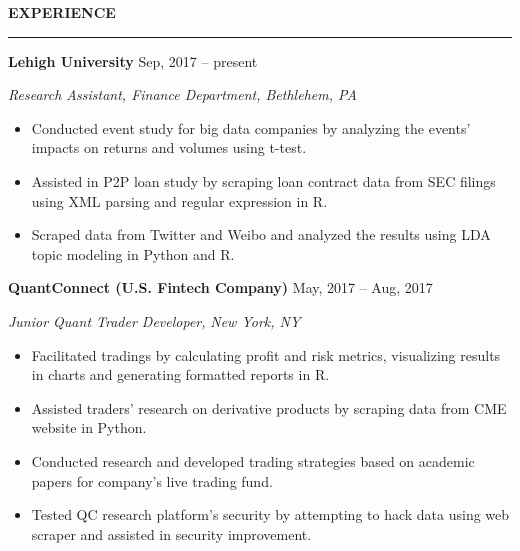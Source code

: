\documentclass[a4paper,12pt]{report}
\newcommand{\marginAdj}{0.5in}
\begin{document}
\noindent 
\textbf{EXPERIENCE} \par
\vspace{2pt}
\hrule
\vspace{6pt}

\noindent 
\textbf{Lehigh University}{\fontsize{9pt}{9pt}\selectfont  \hspace*{4.3in} \hspace*{\marginAdj} {\fontsize{10pt}{10pt}\selectfont Sep, 2017 – present}} \par
\noindent 
{\fontsize{10pt}{10pt}\selectfont \textit{Research Assistant, Finance Department, Bethlehem, PA}} \par
\noindent 
\begin{itemize}[noitemsep,topsep=0pt]
	\item {\fontsize{10pt}{10pt}\selectfont Conducted event study for big data companies by analyzing the events' impacts on returns and volumes using t-test.} \par
	\noindent 
	\item {\fontsize{10pt}{10pt}\selectfont Assisted in P2P loan study by scraping loan contract data from SEC filings using XML parsing and regular expression in R.} \par
	\noindent 
	\item {\fontsize{10pt}{10pt}\selectfont Scraped data from Twitter and Weibo and analyzed the results using LDA topic modeling in Python and R.} \par
\end{itemize}

\noindent 
\textbf{QuantConnect (U.S. Fintech Company)}{\fontsize{9pt}{9pt}\selectfont  \hspace*{2.65in} \hspace*{\marginAdj}  {\fontsize{10pt}{10pt}\selectfont May, 2017 – Aug, 2017}} \par
\noindent 
{\fontsize{10pt}{10pt}\selectfont \textit{Junior Quant Trader Developer}\textit{, }\textit{New York}\textit{, NY}} \par
\noindent 
\begin{itemize}[noitemsep,topsep=0pt]
\item {\fontsize{10pt}{10pt}\selectfont Facilitated tradings by calculating profit and risk metrics, visualizing results in charts and generating formatted reports in R.} \par
\noindent 
\item {\fontsize{10pt}{10pt}\selectfont Assisted traders' research on derivative products by scraping data from CME website in Python. } \par
\noindent 
\item {\fontsize{10pt}{10pt}\selectfont Conducted research and developed trading strategies based on academic papers for company’s live trading fund.} \par
\item {\fontsize{10pt}{10pt}\selectfont Tested QC research platform's security by attempting to hack data using web scraper and assisted in security improvement.} \par
\noindent 
\end{itemize}
\end{document}
